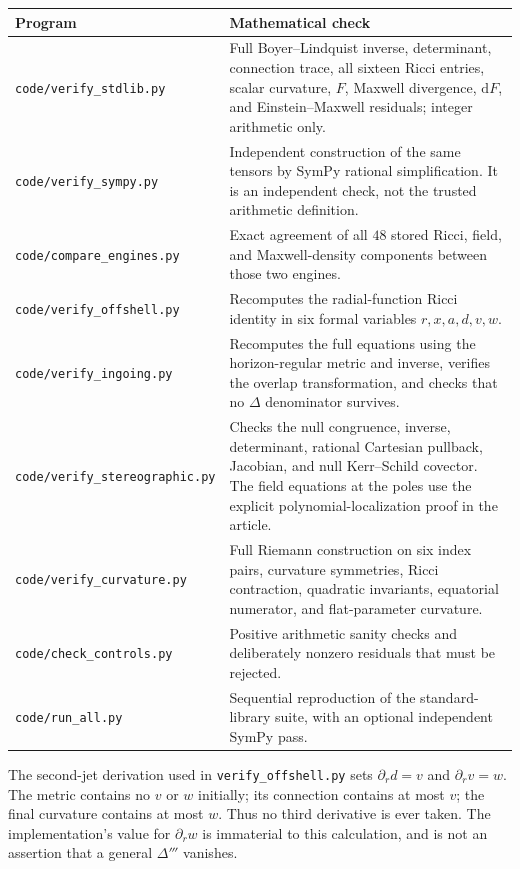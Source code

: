 \documentclass[11pt,a4paper]{article}
\numberwithin{equation}{section}
\theoremstyle{definition}\newtheorem{definition}[theorem]{Definition}
\theoremstyle{remark}\newtheorem{remark}[theorem]{Remark}
\newcommand{\dd}{\mathrm{d}}
\newcommand{\file}[1]{\nolinkurl{#1}}
\begin{document}
\begin{longtable}{>{\raggedright\arraybackslash}p{}>{\raggedright\arraybackslash}p{}}
\toprule
Program & Mathematical check\\\midrule\endhead
\file{code/verify_stdlib.py} & Full Boyer--Lindquist inverse, determinant, connection trace, all sixteen Ricci entries, scalar curvature, $F$, Maxwell divergence, $\dd F$, and Einstein--Maxwell residuals; integer arithmetic only.\\[0.4em]
\file{code/verify_sympy.py} & Independent construction of the same tensors by SymPy rational simplification. It is an independent check, not the trusted arithmetic definition.\\[0.4em]
\file{code/compare_engines.py} & Exact agreement of all $48$ stored Ricci, field, and Maxwell-density components between those two engines.\\[0.4em]
\file{code/verify_offshell.py} & Recomputes the radial-function Ricci identity in six formal variables $r,x,a,d,v,w$.\\[0.4em]
\file{code/verify_ingoing.py} & Recomputes the full equations using the horizon-regular metric and inverse, verifies the overlap transformation, and checks that no $\Delta$ denominator survives.\\[0.4em]
\file{code/verify_stereographic.py} & Checks the null congruence, inverse, determinant, rational Cartesian pullback, Jacobian, and null Kerr--Schild covector. The field equations at the poles use the explicit polynomial-localization proof in the article.\\[0.4em]
\file{code/verify_curvature.py} & Full Riemann construction on six index pairs, curvature symmetries, Ricci contraction, quadratic invariants, equatorial numerator, and flat-parameter curvature.\\[0.4em]
\file{code/check_controls.py} & Positive arithmetic sanity checks and deliberately nonzero residuals that must be rejected.\\[0.4em]
\file{code/run_all.py} & Sequential reproduction of the standard-library suite, with an optional independent SymPy pass.\\\bottomrule
\end{longtable}

The second-jet derivation used in \file{verify_offshell.py} sets $\partial_r d=v$ and $\partial_r v=w$. The metric contains no $v$ or $w$ initially; its connection contains at most $v$; the final curvature contains at most $w$. Thus no third derivative is ever taken. The implementation's value for $\partial_r w$ is immaterial to this calculation, and is not an assertion that a general $\Delta'''$ vanishes.
\end{document}
